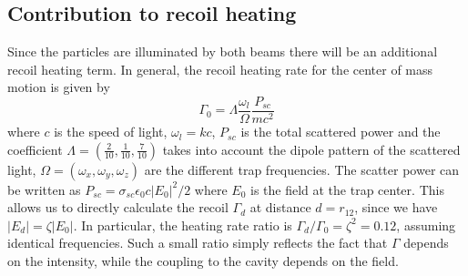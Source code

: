 \documentclass[aps,PRA,%
 amsmath,amssymb,
singlecolumn,
notitlepage,superscriptaddress,groupedaddress]{revtex4}
\begin{document}
\subsection{Contribution to recoil heating}
Since the particles are illuminated by both beams there will be an additional recoil heating term. In general, the recoil heating rate for the center of mass motion is given by~\cite{Seberson2020Distribution}
\begin{equation}\label{eqs_recoil}
    \Gamma_{0}=\Lambda\frac{\omega_l}{\Omega}\frac{P_{sc}}{mc^2}
\end{equation}
\noindent where $c$ is the speed of light, $\omega_l=kc$, $P_{sc}$ is the total scattered power and the coefficient $\Lambda=(\frac{2}{10},\frac{1}{10},\frac{7}{10})$ takes into account the dipole pattern of the scattered light, $\Omega=(\omega_{x},\omega_{y},\omega_{z})$ are the different trap frequencies.  The scatter power can be written as $P_{sc}=\sigma_{sc}\epsilon_0c |E_0|^2/2$ where $E_0$ is the field at the trap center. This allows us to directly calculate the recoil $\Gamma_d$ at distance $d=r_{12}$, since we have $|E_{d}|=\zeta |E_0|$. In particular, the heating rate ratio is $\Gamma_{d}/\Gamma_0=\zeta^2=0.12$, assuming identical frequencies. Such a small ratio simply reflects the fact that $\Gamma$ depends on the intensity, while the coupling to the cavity depends on the field.
\end{document}
